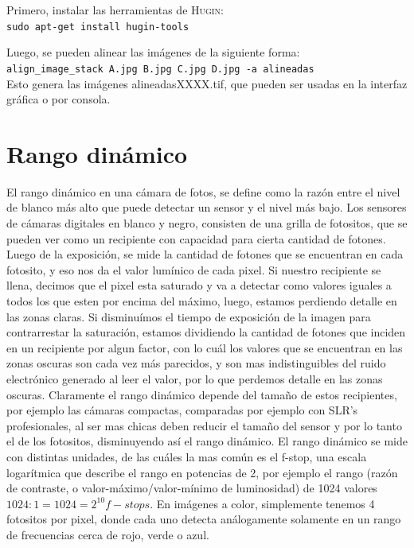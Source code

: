 \documentclass[a4paper,10pt]{article}
\begin{document}
            Primero, instalar las herramientas de \textsc{Hugin}:\\
            \texttt{sudo apt-get install hugin-tools}
            
            Luego, se pueden alinear las imágenes de la siguiente forma:\\
            \texttt{align\_image\_stack A.jpg B.jpg C.jpg D.jpg -a alineadas}\\
            Esto genera las imágenes alineadasXXXX.tif, que pueden ser usadas en la interfaz gráfica o por consola.

    \appendix

    \section{Rango dinámico}

        El rango dinámico en una cámara de fotos, se define como la razón entre el nivel de blanco más alto que puede detectar un sensor y el nivel más bajo. Los sensores de cámaras digitales en blanco y negro, consisten de una grilla de fotositos, que se pueden ver como un recipiente con capacidad para cierta cantidad de fotones. Luego de la exposición, se mide la cantidad de fotones que se encuentran en cada fotosito, y eso nos da el valor lumínico de cada pixel. Si nuestro recipiente se llena, decimos que el pixel esta saturado y va a detectar como valores iguales a todos los que esten por encima del máximo, luego, estamos perdiendo detalle en las zonas claras. Si disminuímos el tiempo de exposición de la imagen para contrarrestar la saturación, estamos dividiendo la cantidad de fotones que inciden en un recipiente por algun factor, con lo cuál los valores que se encuentran en las zonas oscuras son cada vez más parecidos, y son mas indistinguibles del ruido electrónico generado al leer el valor, por lo que perdemos detalle en las zonas oscuras. Claramente el rango dinámico depende del tamaño de estos recipientes, por ejemplo las cámaras compactas, comparadas por ejemplo con SLR's profesionales, al ser mas chicas deben reducir el tamaño del sensor y por lo tanto el de los fotositos, disminuyendo así el rango dinámico. El rango dinámico se mide con distintas unidades, de las cuáles la mas común es el f-stop, una escala logarítmica que describe el rango en potencias de 2, por ejemplo el rango (razón de contraste, o valor-máximo/valor-mínimo de luminosidad) de 1024 valores $1024:1 = 1024 = 2^{10} f-stops$.
        En imágenes a color, simplemente tenemos 4 fotositos por pixel, donde cada uno detecta análogamente solamente en un rango de frecuencias cerca de rojo, verde o azul. 

    
    
\end{document}
